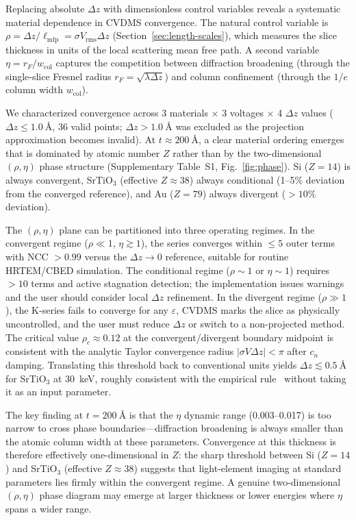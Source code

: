 \documentclass[twoside,11pt]{article}
\begin{document}
Replacing absolute $\Delta z$ with dimensionless control variables reveals a systematic material dependence in CVDMS convergence. The natural control variable is $\rho=\Delta z/\ell_\text{mfp}=\sigma V_\text{rms}\Delta z$ (Section~\ref{sec:length-scales}), which measures the slice thickness in units of the local scattering mean free path. A second variable $\eta=r_F/w_\text{col}$ captures the competition between diffraction broadening (through the single-slice Fresnel radius $r_F=\sqrt{\lambda\Delta z}$) and column confinement (through the $1/e$ column width $w_\text{col}$).

We characterized convergence across 3 materials $\times$ 3 voltages $\times$ 4 $\Delta z$ values ($\Delta z\le\SI{1.0}{\angstrom}$, 36 valid points; $\Delta z>\SI{1.0}{\angstrom}$ was excluded as the projection approximation becomes invalid). At $t\approx\SI{200}{\angstrom}$, a clear material ordering emerges that is dominated by atomic number $Z$ rather than by the two-dimensional $(\rho,\eta)$ phase structure (Supplementary Table~S1, Fig.~\ref{fig:phase}). Si ($Z=14$) is always convergent, SrTiO$_3$ (effective $Z\approx38$) always conditional (1--5\% deviation from the converged reference), and Au ($Z=79$) always divergent ($>10\%$ deviation).


The $(\rho,\eta)$ plane can be partitioned into three operating regimes. In the convergent regime ($\rho\ll1$, $\eta\gtrsim1$), the series converges within $\le5$ outer terms with NCC $>0.99$ versus the $\Delta z\to0$ reference, suitable for routine HRTEM/CBED simulation. The conditional regime ($\rho\sim1$ or $\eta\sim1$) requires $>10$ terms and active stagnation detection; the implementation issues warnings and the user should consider local $\Delta z$ refinement. In the divergent regime ($\rho\gg1$), the K-series fails to converge for any $\varepsilon$, CVDMS marks the slice as physically uncontrolled, and the user must reduce $\Delta z$ or switch to a non-projected method. The critical value $\rho_c\approx0.12$ at the convergent/divergent boundary midpoint is consistent with the analytic Taylor convergence radius $|\sigma V\Delta z|<\pi$ after $c_n$ damping. Translating this threshold back to conventional units yields $\Delta z\lesssim\SI{0.5}{\angstrom}$ for SrTiO$_3$ at \SI{30}{\keV}, roughly consistent with the empirical rule~\cite{Kirkland2020} without taking it as an input parameter.

The key finding at $t=\SI{200}{\angstrom}$ is that the $\eta$ dynamic range (0.003--0.017) is too narrow to cross phase boundaries---diffraction broadening is always smaller than the atomic column width at these parameters. Convergence at this thickness is therefore effectively one-dimensional in $Z$: the sharp threshold between Si ($Z=14$) and SrTiO$_3$ (effective $Z\approx38$) suggests that light-element imaging at standard parameters lies firmly within the convergent regime. A genuine two-dimensional $(\rho,\eta)$ phase diagram may emerge at larger thickness or lower energies where $\eta$ spans a wider range.
\end{document}
